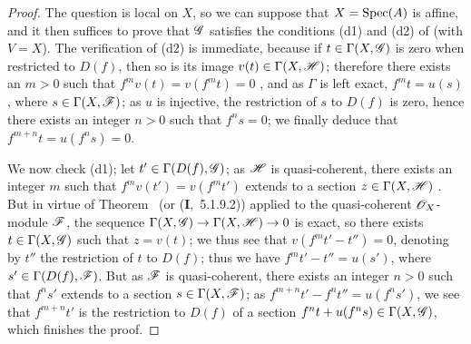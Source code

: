 \begin{proof}
\label{proof-III.1.4.17}
The question is local on $X$, so we can suppose that $X=\operatorname{Spec}(A)$ is affine, and it then suffices to prove that $\mathscr{G}$ satisfies the conditions (d1) and (d2) of  (with $V=X$).
The verification of (d2) is immediate, because if $t\in\Gamma(X,\mathscr{G})$ is zero when restricted to $D(f)$, then so is its image $v(t)\in\Gamma(X,\mathscr{H})$; therefore there exists an $m>0$ such that $f^m v(t)=v(f^m t)=0$ , and as $\Gamma$ is left exact, $f^m t=u(s)$, where $s\in\Gamma(X,\mathscr{F})$; as $u$ is injective, the restriction of $s$ to $D(f)$ is zero, hence  there exists an integer $n>0$ such that $f^n s=0$; we finally deduce that $f^{m+n}t=u(f^n s)=0$.

We now check (d1); let $t'\in\Gamma(D(f),\mathscr{G})$; as $\mathscr{H}$ is quasi-coherent, there exists an integer $m$ such that $f^m v(t')=v(f^m t')$ extends to a section $z\in\Gamma(X,\mathscr{H})$ .
But in virtue of Theorem~ (or (\textbf{I},~5.1.9.2)) applied to the quasi-coherent $\mathscr{O}_X$-module $\mathscr{F}$, the sequence $\Gamma(X,\sh{G})\to\Gamma(X,\sh{H})\to 0$ is exact, so there exists $t\in\Gamma(X,\mathscr{G})$ such that $z=v(t)$; we thus see that $v(f^m t'-t'')=0$, denoting by $t''$ the restriction of $t$ to $D(f)$; thus we have $f^m t'-t''=u(s')$, where $s'\in\Gamma(D(f),\mathscr{F})$.
But as $\mathscr{F}$ is quasi-coherent, there exists an integer $n>0$ such that $f^n s'$ extends to a section $s\in\Gamma(X,\mathscr{F})$; as $f^{m+n}t'-f^n t''=u(f^n s')$, we see that $f^{m+n}t'$ is the restriction to $D(f)$ of a section $f^n t+u(f^n s)\in\Gamma(X,\mathscr{G})$, which finishes the proof.
\end{proof}

